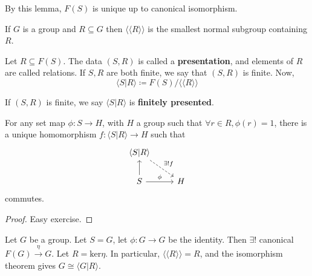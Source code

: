 \documentclass{article}
\numberwithin{nthm}{subsection}
\begin{document}
\begin{remark}
    By this lemma, $F(S)$ is unique up to canonical isomorphism.
\end{remark}

\begin{notation}
    If $G$ is a group and $R \subseteq G$ then $\langle\langle R \rangle\rangle$ is the smallest normal subgroup containing $R$.
\end{notation}

\begin{defi}
    Let $R \subseteq F(S)$. The data $(S, R)$ is called a \textbf{presentation}, and elements of $R$ are called relations.
    If $S, R$ are both finite, we say that $(S, R)$ is finite. Now,
    \begin{equation*}
        \langle S | R \rangle \coloneqq F(S) / \langle\langle R \rangle \rangle
    \end{equation*}

    If $(S, R)$ is finite, we say $\langle S|R\rangle$ is \textbf{finitely presented}.
\end{defi}

\begin{lemma}
    For any set map $\phi:S \to H$, with $H$ a group such that $\forall r \in R, \phi(r) = 1$, there is a unique homomorphism $f: \langle S | R \rangle \to H$ such that
    \begin{equation*}
        \begin{tikzcd}
            \langle S | R \rangle \arrow[rd, dashed, "\exists! f"] & \\
            S \arrow[u] \arrow[r, "\phi"] & H
        \end{tikzcd}
    \end{equation*}
    commutes.
\end{lemma}
\begin{proof}
    Easy exercise.
\end{proof}

\begin{eg}
    Let $G$ be a group. Let $S = G$, let $\phi: G \to G$ be the identity.
    Then $\exists!$ canonical $F(G) \xrightarrow{\eta} G$.
    Let $R = \mathrm{ker} \eta$. In particular, $\langle\langle R \rangle \rangle = R$, and the isomorphism theorem gives $G \cong \langle G | R \rangle$.
\end{eg}
\end{document}
